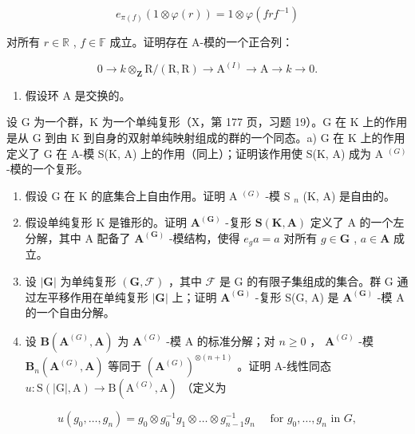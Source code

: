 \[
e _ {\pi (f)} \left(1 \otimes \varphi (r)\right) = 1 \otimes \varphi (f r f ^ {- 1})
\]

对所有 \(r \in \mathbb{R}\) , \(f \in \mathbb{F}\) 成立。证明存在 A-模的一个正合列：

\[
0 \rightarrow k \otimes_ {\mathbf {Z}} \mathrm{R} / (\mathrm{R}, \mathrm{R}) \rightarrow \mathrm{A} ^ {(I)} \rightarrow \mathrm{A} \rightarrow k \rightarrow 0.
\]

\begin{enumerate}
\def\labelenumi{\arabic{enumi})}
\setcounter{enumi}{3}
\tightlist
\item
  假设环 A 是交换的。
\end{enumerate}

设 G 为一个群，K 为一个单纯复形（X，第 177 页，习题 19）。G 在 K 上的作用是从 G 到由 K 到自身的双射单纯映射组成的群的一个同态。a) G 在 K 上的作用定义了 G 在 A-模 S(K, A) 上的作用（同上）；证明该作用使 S(K, A) 成为 A \(^{(G)}\) -模的一个复形。

\begin{enumerate}
\def\labelenumi{\alph{enumi})}
\setcounter{enumi}{1}
\item
  假设 G 在 K 的底集合上自由作用。证明 A \(^{(G)}\) -模 S \(_{n}\) (K, A) 是自由的。
\item
  假设单纯复形 K 是锥形的。证明 \(\mathbf{A}^{(\mathbf{G})}\) -复形 \(\mathbf{S}(\mathbf{K},\mathbf{A})\) 定义了 A 的一个左分解，其中 A 配备了 \(\mathbf{A}^{(\mathbf{G})}\) -模结构，使得 \(e_g a = a\) 对所有 \(g \in \mathbf{G}\) , \(a \in \mathbf{A}\) 成立。
\item
  设 \(|\mathbf{G}|\) 为单纯复形 \((\mathbf{G},\mathcal{F})\) ，其中 \(\mathcal{F}\) 是 G 的有限子集组成的集合。群 G 通过左平移作用在单纯复形 \(|\mathbf{G}|\) 上；证明 \(\mathbf{A}^{(\mathbf{G})}\) -复形 S(\textbar G\textbar, A) 是 \(\mathbf{A}^{(\mathbf{G})}\) -模 A 的一个自由分解。
\item
  设 \(\mathbf{B}(\mathbf{A}^{(G)},\mathbf{A})\) 为 \(\mathbf{A}^{(G)}\) -模 A 的标准分解；对 \(n\geqslant 0\) ， \(\mathbf{A}^{(G)}\) -模 \(\mathbf{B}_n(\mathbf{A}^{(G)},\mathbf{A})\) 等同于 \((\mathbf{A}^{(G)})^{\otimes (n + 1)}\) 。证明 A-线性同态 \(u:\mathrm{S}(|\mathrm{G}|,\mathrm{A})\to \mathrm{B}(\mathrm{A}^{(G)},\mathrm{A})\) （定义为
\end{enumerate}

\[
u \left(g _ {0}, \dots , g _ {n}\right) = g _ {0} \otimes g _ {0} ^ {- 1} g _ {1} \otimes \dots \otimes g _ {n - 1} ^ {- 1} g _ {n} \quad \text { for } g _ {0}, \dots , g _ {n} \text { in } G,
\]

